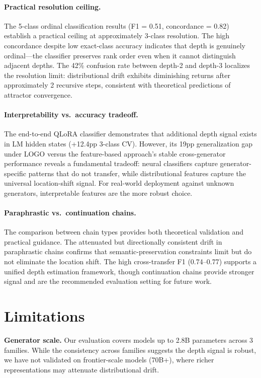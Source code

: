 \documentclass[11pt,a4paper]{article}
\begin{document}
\paragraph{Practical resolution ceiling.} The 5-class ordinal classification results (F1 = 0.51, concordance = 0.82) establish a practical ceiling at approximately 3-class resolution. The high concordance despite low exact-class accuracy indicates that depth is genuinely ordinal---the classifier preserves rank order even when it cannot distinguish adjacent depths. The 42\% confusion rate between depth-2 and depth-3 localizes the resolution limit: distributional drift exhibits diminishing returns after approximately 2 recursive steps, consistent with theoretical predictions of attractor convergence.

\paragraph{Interpretability vs.\ accuracy tradeoff.} The end-to-end QLoRA classifier demonstrates that additional depth signal exists in LM hidden states (+12.4pp 3-class CV). However, its 19pp generalization gap under LOGO versus the feature-based approach's stable cross-generator performance reveals a fundamental tradeoff: neural classifiers capture generator-specific patterns that do not transfer, while distributional features capture the universal location-shift signal. For real-world deployment against unknown generators, interpretable features are the more robust choice.

\paragraph{Paraphrastic vs.\ continuation chains.} The comparison between chain types provides both theoretical validation and practical guidance. The attenuated but directionally consistent drift in paraphrastic chains confirms that semantic-preservation constraints limit but do not eliminate the location shift. The high cross-transfer F1 (0.74--0.77) supports a unified depth estimation framework, though continuation chains provide stronger signal and are the recommended evaluation setting for future work.

\section{Limitations}

\textbf{Generator scale.} Our evaluation covers models up to 2.8B parameters across 3 families. While the consistency across families suggests the depth signal is robust, we have not validated on frontier-scale models (70B+), where richer representations may attenuate distributional drift.
\end{document}
